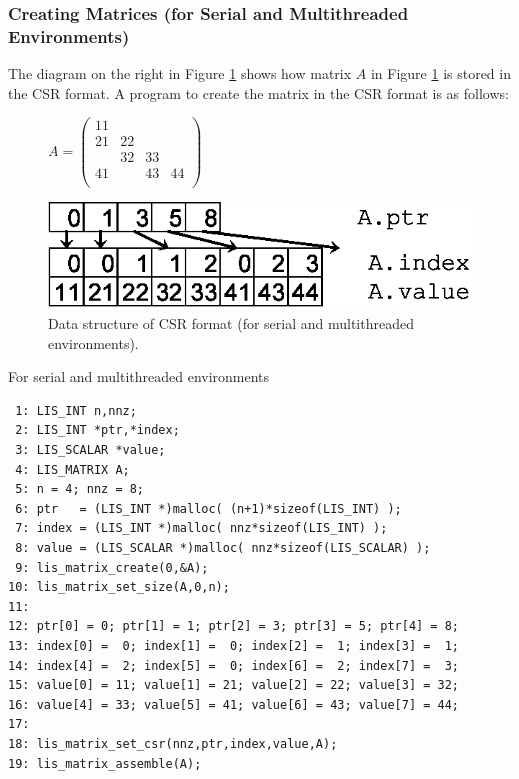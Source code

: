 \documentclass[a4paper]{article}
\begin{document}
\subsubsection{Creating Matrices (for Serial and Multithreaded Environments)}
The diagram on the right in Figure \ref{fig:storage01} shows how matrix $A$ in Figure \ref{fig:storage01} is stored in the CSR format. A program to create the matrix in the CSR format is as follows:
\begin{figure}[h]
{\centering 
\begin{minipage}{0.3\textwidth}
\begin{flushright}
$ \label{eq:mata}
A = \left(
\begin{array}{cccc}
11 &    &    &    \\
21 & 22 &    &    \\
   & 32 & 33 &    \\
41 &    & 43 & 44 \\
\end{array}\right)
$
\end{flushright}
\end{minipage}
\begin{minipage}{0.6\textwidth}
\begin{flushleft}
\includegraphics{storage01.eps} 
\end{flushleft}
\end{minipage}
\caption{Data structure of CSR format (for serial and multithreaded environments).}\label{fig:storage01}}
\end{figure}
\begin{itemsquarebox}[l]{For serial and multithreaded environments}
\small
\begin{verbatim}
 1: LIS_INT n,nnz;
 2: LIS_INT *ptr,*index;
 3: LIS_SCALAR *value;
 4: LIS_MATRIX A;
 5: n = 4; nnz = 8;
 6: ptr   = (LIS_INT *)malloc( (n+1)*sizeof(LIS_INT) );
 7: index = (LIS_INT *)malloc( nnz*sizeof(LIS_INT) );
 8: value = (LIS_SCALAR *)malloc( nnz*sizeof(LIS_SCALAR) );
 9: lis_matrix_create(0,&A);
10: lis_matrix_set_size(A,0,n);
11:
12: ptr[0] = 0; ptr[1] = 1; ptr[2] = 3; ptr[3] = 5; ptr[4] = 8;
13: index[0] =  0; index[1] =  0; index[2] =  1; index[3] =  1;
14: index[4] =  2; index[5] =  0; index[6] =  2; index[7] =  3;
15: value[0] = 11; value[1] = 21; value[2] = 22; value[3] = 32;
16: value[4] = 33; value[5] = 41; value[6] = 43; value[7] = 44;
17:
18: lis_matrix_set_csr(nnz,ptr,index,value,A);
19: lis_matrix_assemble(A);
\end{verbatim}
\end{itemsquarebox}
\end{document}
